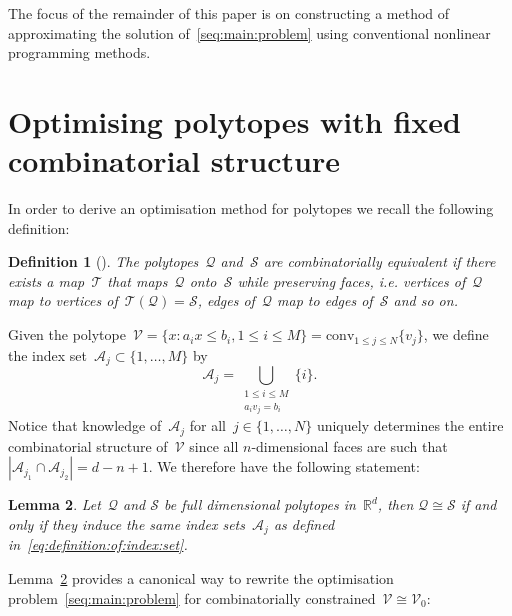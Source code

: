 \documentclass[letterpaper, 10pt, conference]{ieeeconf} %
\newtheorem{thm}{Lemma}[section]
\newtheorem{defn}[thm]{Definition}
\providecommand{\abs}[1]{\left\lvert#1\right\rvert}
\begin{document}
The focus of the remainder of this paper is on constructing a method of approximating the solution of~\eqref{seq:main:problem} using conventional nonlinear programming methods.

\section{Optimising polytopes with fixed combinatorial structure}\label{sec:optimising:polytopes}
%
%
%
\noindent In order to derive an optimisation method for polytopes we recall the following definition:
%
\begin{defn}[\cite{Ziegler:1995}]
The polytopes~$\mathcal Q$ and~$\mathcal S$ are combinatorially equivalent if there exists a map~$\mathcal T$ that maps~$\mathcal Q$ onto~$\mathcal S$ while preserving faces, i.e. vertices of~$\mathcal Q$ map to vertices of~$\mathcal T(\mathcal Q)=\mathcal S$, edges of~$\mathcal Q$ map to edges of~$\mathcal S$ and so on.
\end{defn}
%
Given the polytope~$\mathcal V = \{x:a_ix\leq b_i,1\leq i\leq M\}=\text{conv}_{1\leq j\leq N}\{v_j\}$, we define the index set~$\mathcal A_j\subset\{1,\dots,M\}$ by
%
\begin{equation}\label{eq:definition:of:index:set}
	\mathcal A_j = \bigcup_{\substack{1\leq i\leq M\\ a_i v_j=b_i}}\{i\}.
\end{equation}
%
Notice that knowledge of~$\mathcal A_j$ for all~$j\in\{1,\dots,N\}$ uniquely determines the entire combinatorial structure of~$\mathcal V$ since all $n$-dimensional faces are such that $\abs{\mathcal A_{j_1}\cap\mathcal A_{j_2}}=d-n+1$.
%
We therefore have the following statement:
%
\begin{thm}\label{thm:combinatorial:equivalence}
Let~$\mathcal Q$ and $\mathcal S$ be full dimensional polytopes in~$\mathbb R^d$, then $\mathcal Q\cong\mathcal S$ if and only if they induce the same index sets~$\mathcal A_j$ as defined in~\eqref{eq:definition:of:index:set}.
\end{thm}
%
Lemma~\ref{thm:combinatorial:equivalence} provides a canonical way to rewrite the optimisation problem~\eqref{seq:main:problem} for combinatorially constrained~$\mathcal V\cong\mathcal V_0$:
%
\end{document}
